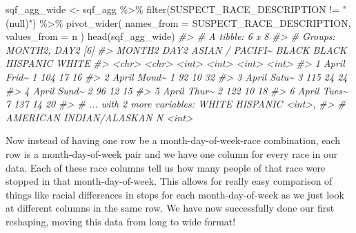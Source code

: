 \documentclass[
]{krantz}
\makeatletter
\newenvironment{Shaded}{\begin{snugshade}}{\end{snugshade}}
\newcommand{\AttributeTok}[1]{\textcolor[rgb]{0.61,0.61,0.61}{#1}}
\newcommand{\CommentTok}[1]{\textcolor[rgb]{0.37,0.37,0.37}{\textit{#1}}}
\newcommand{\FunctionTok}[1]{\textcolor[rgb]{0,0,0}{#1}}
\newcommand{\NormalTok}[1]{#1}
\newcommand{\OtherTok}[1]{\textcolor[rgb]{0.37,0.37,0.37}{#1}}
\newcommand{\SpecialCharTok}[1]{\textcolor[rgb]{0,0,0}{#1}}
\newcommand{\StringTok}[1]{\textcolor[rgb]{0.5,0.5,0.5}{#1}}
\newenvironment{kframe}{%
\medskip{}
\setlength{\fboxsep}{.8em}
 \def\at@end@of@kframe{}%
 \ifinner\ifhmode%
  \def\at@end@of@kframe{\end{minipage}}%
  \begin{minipage}{\columnwidth}%
 \fi\fi%
 \def\FrameCommand##1{\hskip\@totalleftmargin \hskip-\fboxsep
 \colorbox{shadecolor}{##1}\hskip-\fboxsep
     \hskip-\linewidth \hskip-\@totalleftmargin \hskip\columnwidth}%
 \MakeFramed {\advance\hsize-\width
   \@totalleftmargin\z@ \linewidth\hsize
   \@setminipage}}%
 {\par\unskip\endMakeFramed%
 \at@end@of@kframe}
\renewenvironment{Shaded}{\begin{kframe}}{\end{kframe}}
\makeatother
\begin{document}
\begin{Shaded}
\begin{Highlighting}[]
\NormalTok{sqf\_agg\_wide }\OtherTok{\textless{}{-}}\NormalTok{ sqf\_agg }\SpecialCharTok{\%\textgreater{}\%}
  \FunctionTok{filter}\NormalTok{(SUSPECT\_RACE\_DESCRIPTION }\SpecialCharTok{!=} \StringTok{"(null)"}\NormalTok{) }\SpecialCharTok{\%\textgreater{}\%}
  \FunctionTok{pivot\_wider}\NormalTok{(}
    \AttributeTok{names\_from =}\NormalTok{ SUSPECT\_RACE\_DESCRIPTION,}
    \AttributeTok{values\_from =}\NormalTok{ n}
\NormalTok{  )}
\FunctionTok{head}\NormalTok{(sqf\_agg\_wide)}
\CommentTok{\#\textgreater{} \# A tibble: 6 x 8}
\CommentTok{\#\textgreater{} \# Groups:   MONTH2, DAY2 [6]}
\CommentTok{\#\textgreater{}   MONTH2 DAY2  \textasciigrave{}ASIAN / PACIFI\textasciitilde{} BLACK \textasciigrave{}BLACK HISPANIC\textasciigrave{} WHITE}
\CommentTok{\#\textgreater{}   \textless{}chr\textgreater{}  \textless{}chr\textgreater{}            \textless{}int\textgreater{} \textless{}int\textgreater{}            \textless{}int\textgreater{} \textless{}int\textgreater{}}
\CommentTok{\#\textgreater{} 1 April  Frid\textasciitilde{}                1   104               17    16}
\CommentTok{\#\textgreater{} 2 April  Mond\textasciitilde{}                1    92               10    32}
\CommentTok{\#\textgreater{} 3 April  Satu\textasciitilde{}                3   115               24    24}
\CommentTok{\#\textgreater{} 4 April  Sund\textasciitilde{}                2    96               12    15}
\CommentTok{\#\textgreater{} 5 April  Thur\textasciitilde{}                2   122               10    18}
\CommentTok{\#\textgreater{} 6 April  Tues\textasciitilde{}                7   137               14    20}
\CommentTok{\#\textgreater{} \# ... with 2 more variables: WHITE HISPANIC \textless{}int\textgreater{},}
\CommentTok{\#\textgreater{} \#   AMERICAN INDIAN/ALASKAN N \textless{}int\textgreater{}}
\end{Highlighting}
\end{Shaded}

Now instead of having one row be a month-day-of-week-race
combination, each row is a month-day-of-week pair and we
have one column for every race in our data. Each of these
race columns tell us how many people of that race were
stopped in that month-day-of-week. This allows for really
easy comparison of things like racial differences in stops
for each month-day-of-week as we just look at different
columns in the same row. We have now successfully done our
first reshaping, moving this data from long to wide format!
\end{document}
